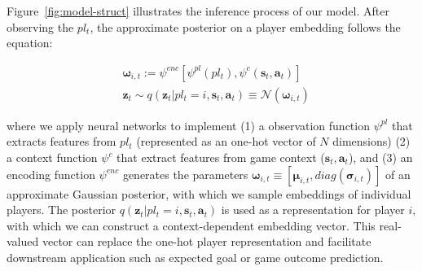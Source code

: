 \documentclass[letterpaper]{article} %
\newcommand{\context}{c}
\newcommand{\expect}{\mathbb{E}}
\newcommand{\latentvariables}{\mathbf{z}}
\newcommand{\inference}{q}
\newcommand{\state}{\mathbf{s}}
\newcommand{\action}{\mathbf{a}}
\newcommand{\player}{pl}
\newcommand{\pindex}{i}
\newcommand{\GaussianParameters}{\boldsymbol{\omega}}
\begin{document}
Figure~\ref{fig:model-struct} illustrates the inference process of our model. After observing the $\player_{t}$, the approximate posterior on a player embedding follows the equation:

\begin{align}
& \boldsymbol{\GaussianParameters}_{\pindex,t}:=\psi^{enc}[\psi^{\player}(\player_{t}),\psi^{\context}(\state_{t},\action_{t})]\\
& \latentvariables_{t} \sim \inference(\latentvariables_{t} |\player_{t} = \pindex,\state_{t},\action_{t}) \equiv \mathcal{N}(\boldsymbol{\GaussianParameters}_{\pindex,t})\label{eqn:approximate-posterior}
\end{align}



\noindent where we apply neural networks to implement (1) a observation function $\psi^{\player}$ that extracts features from  $\player_{t}$ (represented as an one-hot vector of $N$ dimensions)
(2) a context function $\psi^{\context}$ that extract features from game context ($\state_{t},\action_{t}$), and (3) an encoding function $\psi^{enc}$ generates the parameters $\boldsymbol{\GaussianParameters}_{\pindex,t}\equiv[\boldsymbol{\mu}_{\pindex,t},diag(\boldsymbol{\sigma}_{\pindex,t})]$ of an approximate Gaussian posterior, with which we sample embeddings of individual players.
The posterior $\inference(\latentvariables_{t} |\player_{t}=\pindex,\state_{t},\action_{t})$ is used as a 
representation for player $\pindex$, with which we can construct a context-dependent embedding vector. This real-valued vector can replace the one-hot player representation and facilitate downstream application such as expected goal or game outcome prediction.
\end{document}
